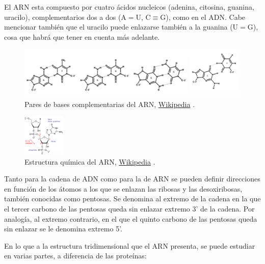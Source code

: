 \documentclass[a4paper,11pt,titlepage]{article}
\theoremstyle{definition}
\begin{document}
El ARN esta compuesto por cuatro ácidos nucleicos (adenina, citosina, guanina, uracilo), complementarios dos a dos (A$=$U, C$\equiv$G), como en el ADN. Cabe mencionar también que el uracilo puede enlazarse también a la guanina (U$=$G), cosa que habrá que tener en cuenta más adelante.

\begin{figure}[H]
    \centering
    \includegraphics[width=\textwidth]{images/RNA_base_pairs.png}
    \small{\caption{Pares de bases complementarias del ARN, \href{https://es.wikipedia.org/wiki/Apareamiento_de_bases}{Wikipedia} \cite{apbases}.}\label{fig:RNA_base_pairs}}\normalsize
\end{figure}


\begin{figure}
    \begin{center}
      \includegraphics[width=0.18\textwidth]{images/RNA_chemical_structure.png}
    \end{center}
    \small{\caption{Estructura química del ARN, \href{https://es.m.wikipedia.org/wiki/Archivo:RNA_chemical_structure.png}{Wikipedia} \cite{rnachem}.}\label{fig:arnchain}}\normalsize
\end{figure}

Tanto para la cadena de ADN como para la de ARN se pueden definir direcciones en función de los átomos a los que se enlazan las ribosas y las desoxiribosas, también conocidas como pentosas. Se denomina al extremo de la cadena en la que el tercer carbono de las pentosas queda sin enlazar extremo 3' de la cadena. Por analogía, al extremo contrario, en el que el quinto carbono de las pentosas queda sin enlazar se le denomina extremo 5'.

En lo que a la estructura tridimensional que el ARN presenta, se puede estudiar en varias partes, a diferencia de las proteínas:
\end{document}
